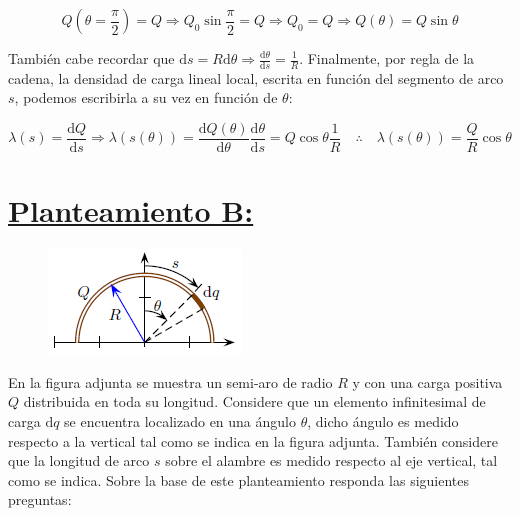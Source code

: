 \documentclass[a4paper,10pt]{article}
\begin{document}
\begin{equation*}
    Q(\theta=\frac{\pi}{2})=Q\Longrightarrow Q_{0}\sin\frac{\pi}{2}=Q
    \Longrightarrow Q_{0}=Q \Longrightarrow Q(\theta)=Q\sin\theta
\end{equation*}

Tambi\'en cabe recordar que
$\mathrm{d}s=R\mathrm{d}\theta\Longrightarrow\frac{\mathrm{d}\theta}{\mathrm{d}s}=\frac{1}{R}$.
Finalmente, por regla de la cadena, la densidad de carga lineal local, escrita en
funci\'on del segmento de arco $s$, podemos escribirla a su vez en funci\'on de $\theta$:

\begin{equation*}
    \lambda(s)=\frac{\mathrm{d}Q}{\mathrm{d}s}
    \Longrightarrow\lambda(s(\theta))
    =\frac{\mathrm{d}Q(\theta)}{\mathrm{d}\theta}\frac{\mathrm{d}\theta}{\mathrm{d}s}
    =Q\cos\theta\frac{1}{R}\quad\therefore\quad
    \boxed{\lambda(s(\theta))=\frac{Q}{R}\cos\theta}
\end{equation*}

\section*{\underline{Planteamiento B:}}

\begin{figure}
    \centering\includegraphics[width=\linewidth]{Graphics/PlanteamientoB.png}
    \vspace{-15pt}
\end{figure}

En la figura adjunta se muestra un semi-aro de radio $R$
y con una carga positiva $Q$ distribuida en toda su longitud. Considere que
un elemento infinitesimal de carga $\mathrm{d}q$ se encuentra localizado en una ángulo
$\theta$, dicho ángulo es medido respecto a la vertical tal como se indica en la
figura adjunta. También considere que la longitud de arco $s$ sobre el alambre
es medido respecto al eje vertical, tal como se indica. Sobre la base de este
planteamiento responda las siguientes preguntas:
\end{document}
